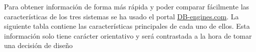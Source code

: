 

Para obtener información de forma más rápida y poder comparar fácilmente las características 
de los tres sistemas se ha usado el portal \href{https://db-engines.com/en/system/MongoDB\%3BPrometheus\%3BRedis}{DB-engines.com}. 
La siguiente tabla contiene las características principales de cada uno de ellos. Esta información
solo tiene carácter orientativo y será contrastada a la hora de tomar una decisión de diseño


